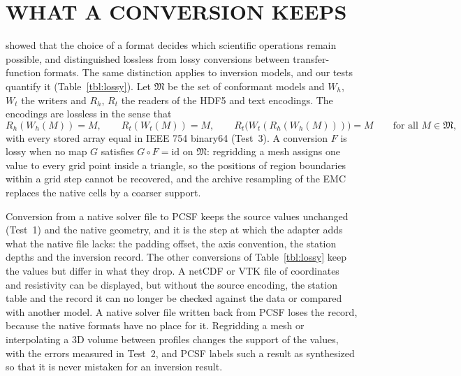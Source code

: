 \documentclass[manuscript]{geophysics}
\begin{document}
\section{WHAT A CONVERSION KEEPS}

\citet{Kelbert2020} showed that the choice of a format decides which
scientific operations remain possible, and distinguished lossless from
lossy conversions between transfer-function formats. The same
distinction applies to inversion models, and our tests quantify it
(Table~\ref{tbl:lossy}). Let $\mathfrak{M}$ be the set of conformant
models and $W_h$, $W_t$ the writers and $R_h$, $R_t$ the readers of
the HDF5 and text encodings. The encodings are lossless in the sense
that
\begin{equation}
R_h(W_h(M)) = M,\qquad R_t(W_t(M)) = M,\qquad
R_t\big(W_t(R_h(W_h(M)))\big) = M
\qquad \text{for all } M \in \mathfrak{M},
\label{eq:lossless}
\end{equation}
with every stored array equal in IEEE 754 binary64 (Test~3). A
conversion $F$ is lossy when no map $G$ satisfies $G \circ F =
\mathrm{id}$ on $\mathfrak{M}$: regridding a mesh assigns one value to
every grid point inside a triangle, so the positions of region
boundaries within a grid step cannot be recovered, and the archive
resampling of the EMC replaces the native cells by a coarser support.

Conversion from a native solver file to PCSF keeps the source values
unchanged (Test~1) and the native geometry, and it is the step at which
the adapter adds what the native file lacks: the padding offset, the
axis convention, the station depths and the inversion record. The
other conversions of Table~\ref{tbl:lossy} keep the values but differ
in what they drop. A netCDF or VTK file of coordinates and resistivity
can be displayed, but without the source encoding, the station table
and the record it can no longer be checked against the data or
compared with another model. A native solver file written back from
PCSF loses the record, because the native formats have no place for
it. Regridding a mesh or interpolating a 3D volume between profiles
changes the support of the values, with the errors measured in
Test~2, and PCSF labels such a result as synthesized so that it is
never mistaken for an inversion result.
\end{document}
